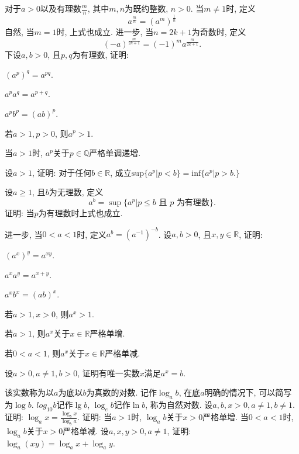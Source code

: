 \begin{quizb}
\woe 对于\(a>0\)以及有理数\(\frac{m}{n}\), 其中\(m,n\)为既约整数, \(n>0\). 当\(m\ne 1\)时, 定义\[a^{\frac{m}{n}}=\left(a^m\right)^\frac{1}{n}\]
        自然, 当\(m=1\)时, 上式也成立. 进一步, 当\(n=2k+1\)为奇数时, 定义\[(-a)^{\frac{m}{2k+1}}=(-1)^ma^{\frac{m}{2k+1}}.\]下设\(a,b>0\), 且\(p,q\)为有理数, 证明:
\begin{compactenum}[\quad (1)]
            \item \((a^p)^q=a^{pq}\).
            \item \(a^pa^q=a^{p+q}\).
            \item \(a^pb^p=(ab)^p\).
            \item 若\(a>1,p>0\), 则\(a^p>1\).
            \item 当\(a>1\)时, \(a^p\)关于\(p\in\mathbb{Q}\)严格单调递增.
            \item 设\(a>1\), 证明: 对于任何\(b\in\mathbb{R}\), 成立\(\mathrm{sup}\{a^p|p<b\}=\mathrm{inf}\{a^p|p>b.\}\)
\end{compactenum}
\woe 设\(a\geqslant 1\), 且\(b\)为无理数, 定义\[a^b=\sup\{a^p|p\leqslant b \text{ 且 }p\text{ 为有理数}\}.\]
证明: 当\(p\)为有理数时上式也成立. 

进一步, 当\(0<a<1\)时, 定义\(a^b=(a^{-1})^{-b}\).
\woe 设\(a,b>0\), 且\(x,y\in \mathbb{R}\), 证明:
\begin{quizcs}
\item \(\left(a^x\right)^y=a^{xy}\).
\item \(a^xa^y=a^{x+y}\).
\item \(a^xb^x=(ab)^x\).
\item 若\(a>1,x>0\), 则\(a^x>1\).
\item 若\(a>1\), 则\(a^x\)关于\(x\in \mathbb{R}\)严格单增.
\item 若\(0<a<1\), 则\(a^x\)关于\(x\in \mathbb{R}\)严格单减.
\end{quizcs}
\woe 设\(a>0,a\ne 1,b>0\), 证明有唯一实数\(x\)满足\(a^x=b\).
        
该实数称为以\(a\)为底以\(b\)为真数的对数. 记作\(\log_ab\), 在底\(a\)明确的情况下, 可以简写为\(\log b\). \(log_{10}b\)记作\(\lg b\), \(\log_eb\)记作\(\ln b\), 称为自然对数.
\woe 设\(a,b,x>0,a\ne 1,b\ne 1\). 证明: \(\log_ax=\frac{\log_bx}{\log_ba}\).
\woe 证明: 当\(a>1\)时, \(\log_ab\)关于\(x>0\)严格单增. 当\(0<a<1\)时, \(\log_ab\)关于\(x>0\)严格单减.
\woe 设\(a,x,y>0,a\ne 1\), 证明: \(\log_a(xy)=\log_ax+\log_ay\). 
\end{quizb}
